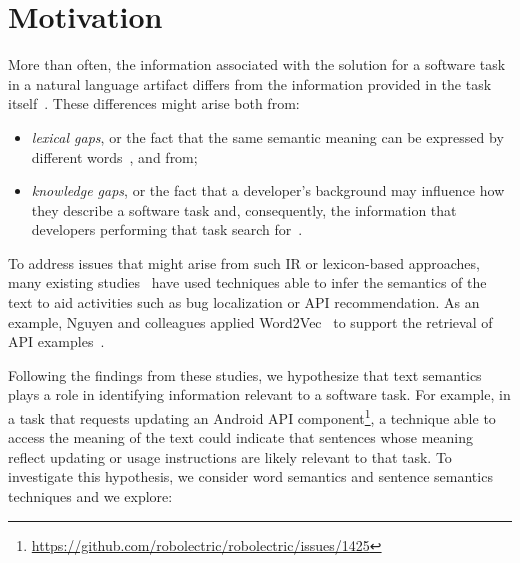 \section{Motivation}
\label{cp5:motivation}



More than often, the information associated 
with the solution for a software task in a natural language artifact differs from the information provided in the task itself~\cite{silva2019, Ye2016}.
These differences might arise both from:

\begin{itemize}
    \item \textit{lexical gaps}, or the fact that the same semantic meaning can be expressed by different words~\cite{Huang2018}, and from;
    \item \textit{knowledge gaps},
    or the fact that a developer's background may 
    influence how they describe a software task and, consequently,
    the information that developers performing that task search for~\cite{Kevic2014}.
\end{itemize}











To address issues that might arise from such \acs{IR} or lexicon-based approaches, many existing studies~\cite{silva2019, Huang2018, Ye2016} have used 
techniques able to infer the semantics of the text to aid activities such as bug localization or API recommendation. As an example, Nguyen and colleagues applied Word2Vec~\cite{Mikolov2013space} to support the retrieval of API examples~\cite{nguyen2017}.



Following the findings from these studies, we hypothesize that text semantics plays a role in identifying information relevant to a software task. 
For example, in a task that requests updating an Android API component\footnote{\url{https://github.com/robolectric/robolectric/issues/1425}}, a technique
able to access the meaning of the text could indicate that sentences whose meaning reflect updating or usage instructions
are likely relevant to that task.
To investigate this hypothesis, we consider 
word semantics and sentence semantics techniques and we explore: 



